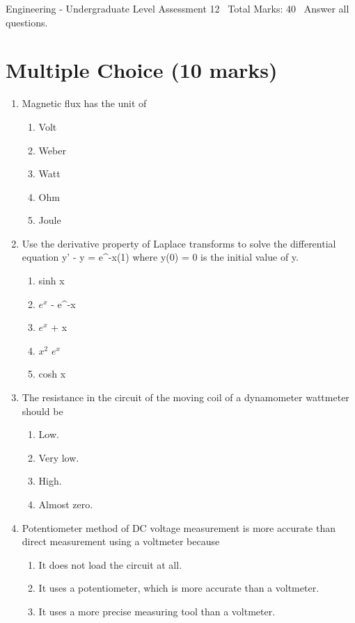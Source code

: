 \documentclass[12pt]{article}
\begin{document}
\begin{center}
Engineering - Undergraduate Level Assessment 12 \
Total Marks: 40 \
Answer all questions.
\end{center}

\section*{Multiple Choice (10 marks)}
\begin{enumerate}[label=\arabic*.]
\item Magnetic flux has the unit of
\begin{enumerate}[label=(\alph*)]
    \item Volt
    \item Weber
    \item Watt
    \item Ohm
    \item Joule
\end{enumerate}
\item Use the derivative property of Laplace transforms to solve the differential equation y' - y = e^-x(1) where y(0) = 0 is the initial value of y.
\begin{enumerate}[label=(\alph*)]
    \item sinh x
    \item $e^x$ - e^-x
    \item $e^x$ + x
    \item $x^2$ $e^x$
    \item cosh x
\end{enumerate}
\item The resistance in the circuit of the moving coil of a dynamometer wattmeter should be
\begin{enumerate}[label=(\alph*)]
    \item Low.
    \item Very low.
    \item High.
    \item Almost zero.
\end{enumerate}
\item Potentiometer method of DC voltage measurement is more accurate than direct measurement using a voltmeter because
\begin{enumerate}[label=(\alph*)]
    \item It does not load the circuit at all.
    \item It uses a potentiometer, which is more accurate than a voltmeter.
    \item It uses a more precise measuring tool than a voltmeter.

\end{enumerate}
\end{enumerate}
\end{document}
